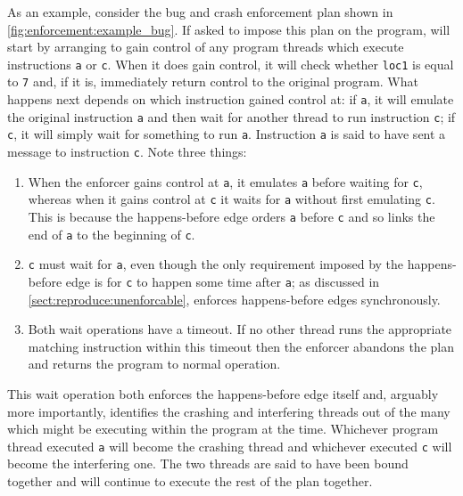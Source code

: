 As an example, consider the bug and crash enforcement plan shown in
\autoref{fig:enforcement:example_bug}.  If asked to impose this plan
on the program, {\technique} will start by arranging to gain control
of any program threads which execute instructions {\tt a} or {\tt c}.
When it does gain control, it will check whether \texttt{loc1} is
equal to \texttt{7} and, if it is, immediately return control to the
original program.  What happens next depends on which instruction
{\technique} gained control at: if {\tt a}, it will emulate the
original instruction {\tt a} and then wait for another thread to run
instruction {\tt c}; if {\tt c}, it will simply wait for something to
run {\tt a}.  Instruction {\tt a} is said to have sent a message to
instruction {\tt c}.  Note three things:
\begin{enumerate}
\item When the enforcer gains control at {\tt a}, it emulates {\tt a}
  before waiting for {\tt c}, whereas when it gains control at {\tt c}
  it waits for {\tt a} without first emulating {\tt c}.  This is
  because the happens-before edge orders {\tt a} before {\tt c} and so
  links the end of {\tt a} to the beginning of {\tt c}.
\item {\tt c} must wait for {\tt a}, even though the only requirement
  imposed by the happens-before edge is for {\tt c} to happen some
  time after {\tt a}; as discussed in
  \autoref{sect:reproduce:unenforcable}, {\technique} enforces
  happens-before edges synchronously.
\item Both wait operations have a timeout.  If no other thread runs
  the appropriate matching instruction within this timeout then the
  enforcer abandons the plan and returns the program to normal
  operation.
\end{enumerate}
This wait operation both enforces the happens-before edge itself and,
arguably more importantly, identifies the crashing and interfering
threads out of the many which might be executing within the program at
the time.  Whichever program thread executed {\tt a} will become the
crashing thread and whichever executed {\tt c} will become the
interfering one.  The two threads are said to have been bound together
and will continue to execute the rest of the plan together.

